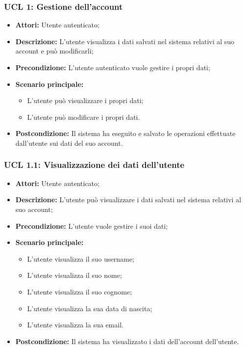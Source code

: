 \hypertarget{L}{}
\subsubsection{UCL 1: Gestione dell'account} %
\begin{itemize}
	\item \textbf{Attori:} Utente autenticato;
	\item \textbf{Descrizione:} L'utente visualizza i dati salvati nel sistema relativi al suo account e può modificarli;
	\item \textbf{Precondizione:} L'utente autenticato vuole gestire i propri dati;
	\item \textbf{Scenario principale:}
	\begin{itemize}
		\item L'utente può visualizzare i propri dati;
		\item L'utente può modificare i propri dati.
	\end{itemize}
	\item \textbf{Postcondizione:} Il sistema ha eseguito e salvato le operazioni effettuate dall'utente sui dati del suo account.
\end{itemize}

\hypertarget{L1.1}{}
\subsubsection{UCL 1.1: Visualizzazione dei dati dell'utente}
\begin{itemize}
	\item \textbf{Attori:} Utente autenticato;
	\item \textbf{Descrizione:} L'utente può visualizzare i dati salvati nel sistema relativi al suo account;
	\item \textbf{Precondizione:} L'utente vuole gestire i suoi dati;
	\item \textbf{Scenario principale:}
	\begin{itemize}
		\item L'utente visualizza il suo username;
		\item L'utente visualizza il suo nome;
		\item L'utente visualizza il suo cognome;
		\item L'utente visualizza la sua data di nascita;
		\item L'utente visualizza la sua email.
	\end{itemize}
	\item \textbf{Postcondizione:} Il sistema ha visualizzato i dati dell'account dell'utente.
\end{itemize}

